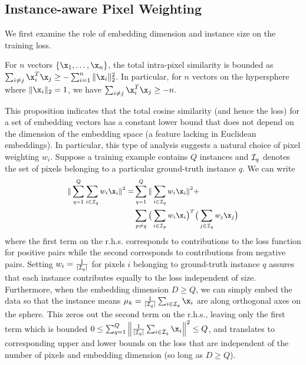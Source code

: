 \subsection{Instance-aware Pixel Weighting}
We first examine the role of embedding dimension and instance size on the
training loss.
\begin{propositions}
\label{theorem:ObjLowerBound}
For $n$ vectors $\{\x_1, \dots, \x_n\}$, the total intra-pixel similarity is
bounded as $\sum_{i\neq j} \x_i^T\x_j \ge -\sum_{i=1}^n  \Vert \x_i \Vert_2^2$.
In particular, for $n$ vectors on the hypersphere where $\Vert\x_i\Vert_2 = 1$,
we have $\sum_{i\neq j} \x_i^T\x_j \ge -n$.
\end{propositions}
This proposition indicates that the total cosine similarity (and hence the loss)
for a set of embedding vectors has a constant lower bound that does not depend
on the dimension of the embedding space (a feature lacking in Euclidean
embeddings). In particular, this type of analysis suggests a natural choice of
pixel weighting $w_i$. Suppose a training example contains $Q$ instances and
${\cal I}_q$ denotes the set of pixels belonging to a particular ground-truth
instance $q$.  We can write
\begin{equation}
\small
\begin{split}
\| \sum_{q=1}^Q \sum_{i \in {\cal I}_q} w_i \x_i \|^2 = &
\sum_{q=1}^Q \| \sum_{i \in {\cal I}_q} w_i \x_i \|^2 + \\
&\sum_{p \neq q} \big(\sum_{i \in {\cal I}_p} w_i \x_i \big)^T \big(\sum_{j \in {\cal I}_q} w_j \x_j \big)
\end{split}
\nonumber
\end{equation}
where the first term on the r.h.s. corresponds to contributions to the loss
function for positive pairs while the second corresponds to contributions
from negative pairs. Setting $w_i = \frac{1}{\vert {\cal I}_q\vert}$ for pixels $i$
belonging to ground-truth instance $q$ assures that each instance contributes
equally to the loss independent of size. Furthermore, when the embedding
dimension $D \geq Q$, we can simply embed the data so that the instance means
$ \mu_k = \frac{1}{\vert {\cal I}_q\vert} \sum_{i \in {\cal I}_q} \x_i $
are along orthogonal axes on the sphere. This zeros out the second term on
the r.h.s., leaving only the first term which is bounded
$
0 \leq \sum_{q=1}^Q \left\| \frac{1}{\vert {\cal I}_q \vert} \sum_{i \in {\cal I}_q} \x_i \right\|^2 \leq Q$,
and translates to corresponding upper and lower bounds on the loss
that are independent of the number of pixels and embedding dimension
(so long as $D \geq Q$).

